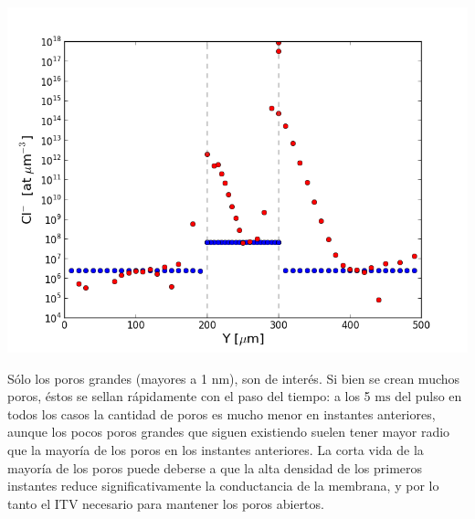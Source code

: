 \documentclass[a0,portrait]{a0poster}
\begin{document}
\begin{multicols}{2}
\begin{multicols}{2}
	\begin{center}\vspace{1cm}
		\includegraphics[width=1\linewidth]
		{curv-CL-50-64-160KVm}
	\end{center}

\end{multicols}

Sólo los poros grandes (mayores a 1 $\si{\nano\metre}$), son de interés. Si bien se crean muchos poros, éstos se sellan rápidamente con el paso del tiempo: a los 5 $\si{\milli\second}$ del pulso en todos los casos la cantidad de poros es mucho menor en instantes anteriores, aunque los pocos poros grandes que siguen existiendo suelen tener mayor radio que la mayoría de los poros en los instantes anteriores. La corta vida de la mayoría de los poros puede deberse a que la alta densidad de los primeros instantes reduce significativamente la conductancia de la membrana, y por lo tanto el ITV necesario para mantener los poros abiertos.



\end{multicols}
\end{document}
